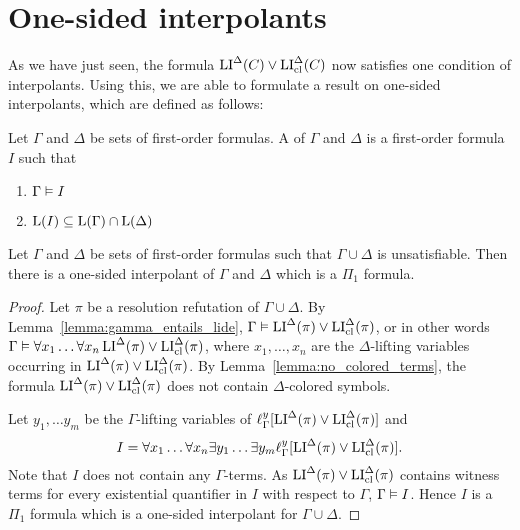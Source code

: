 \documentclass[,%
	draft=false,%
	numbers=noendperiod
	11pt,
	a4paper,
	oneside,%
	openany,
]{memoir}
\begin{document}
\section{One-sided interpolants}

As we have just seen, the formula $\operatorname{LI}^\Delta(C) \lor \operatorname{LI}_{\operatorname{cl}}^\Delta(C)$ now satisfies one condition of interpolants.
Using this, we are able to formulate a result on one-sided interpolants, which are defined as follows:

\begin{defi}
	Let $\Gamma$ and $\Delta$ be sets of first-order formulas.
	A  of $\Gamma$ and $\Delta$ is a first-order formula $I$ such that
	\begin{enumerate}
		\item $\Gamma \vDash I$
		\item $\operatorname{L}(I) \subseteq \operatorname{L}(\Gamma) \cap \operatorname{L}(\Delta)$
			\qedhere
	\end{enumerate}
\end{defi}

\begin{prop}
	Let $\Gamma$ and $\Delta$ be sets of first-order formulas such that $\Gamma\cup\Delta$ is unsatisfiable.
	Then there is a one-sided interpolant of $\Gamma$ and $\Delta$ which is a $\Pi_1$ formula.
\end{prop}
\begin{proof}
	Let $\pi$ be a resolution refutation of $\Gamma\cup\Delta$.
	By Lemma~\ref{lemma:gamma_entails_lide}, $\Gamma \vDash \operatorname{LI}^\Delta(\pi) \lor \operatorname{LI}_{\operatorname{cl}}^\Delta(\pi)$,
	or in other words
	$\Gamma \vDash \forall x_1 \dots \forall x_n  \operatorname{LI}^\Delta(\pi) \lor \operatorname{LI}_{\operatorname{cl}}^\Delta(\pi)$, where $x_1, \dots, x_n$ are the $\Delta$-lifting variables occurring in $\operatorname{LI}^\Delta(\pi) \lor \operatorname{LI}_{\operatorname{cl}}^\Delta(\pi)$.
	By Lemma~\ref{lemma:no_colored_terms}, the formula $\operatorname{LI}^\Delta(\pi) \lor \operatorname{LI}_{\operatorname{cl}}^\Delta(\pi)$ does not contain $\Delta$-colored symbols.

	Let $y_1, \dots y_m$ be the $\Gamma$-lifting variables of $\ell_{\Gamma}^{y}[\operatorname{LI}^\Delta(\pi) \lor \operatorname{LI}_{\operatorname{cl}}^\Delta(\pi)]$
	and
	\[I = \forall x_1 \dots \forall x_n \exists y_1 \dots \exists y_m \ell_{\Gamma}^{y}[\operatorname{LI}^\Delta(\pi) \lor \operatorname{LI}_{\operatorname{cl}}^\Delta(\pi)].\]
	Note that $I$ does not contain any $\Gamma$-terms.
	As $\operatorname{LI}^\Delta(\pi) \lor \operatorname{LI}_{\operatorname{cl}}^\Delta(\pi)$ contains witness terms for every existential quantifier in $I$ with respect to $\Gamma$, $\Gamma \vDash I$.
	Hence $I$ is a $\Pi_1$ formula which is a one-sided interpolant for $\Gamma \cup \Delta$.
\end{proof}
\end{document}
